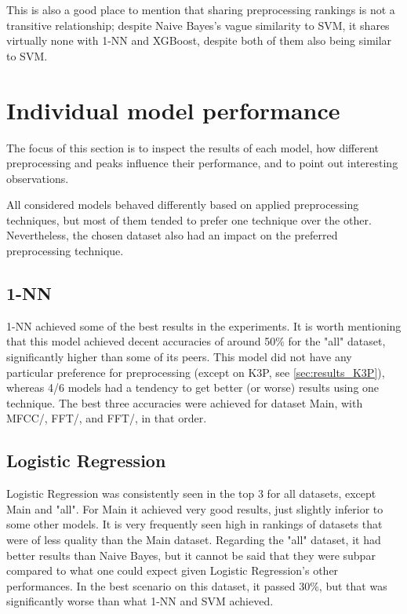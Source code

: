 \documentclass[../main.tex]{subfiles}
\begin{document}
This is also a good place to mention that sharing preprocessing rankings is not a transitive relationship; despite Naive Bayes's vague similarity to SVM, it shares virtually none with 1-NN and XGBoost, despite both of them also being similar to SVM.

\section{Individual model performance} %
\label{sec:results_individual_model_performance}
\newcommand{\plotmodelsummary}[2]{%
\begin{figure}[H]%
    \centering%
    \texttt{[image: figures/plots/model\_summary/\#1.pdf]}%
    \caption{All accuracies achieved by #1 across datasets, peak types, and preprocessing techniques}
    \label{#2}%
\end{figure}%
}%

The focus of this section is to inspect the results of each model, how different preprocessing and peaks influence their performance, and to point out interesting observations. 

All considered models behaved differently based on applied preprocessing techniques, but most of them tended to prefer one technique over the other. Nevertheless, the chosen dataset also had an impact on the preferred preprocessing technique.

\subsection{1-NN}
1-NN achieved some of the best results in the experiments. It is worth mentioning that this model achieved decent accuracies of around 50\% for the "all" dataset, significantly higher than some of its peers.
This model did not have any particular preference for preprocessing (except on K3P, see \ref{sec:results_K3P}), whereas 4/6 models had a tendency to get better (or worse) results using one technique. 
The best three accuracies were achieved for dataset Main, with MFCC/, FFT/, and FFT/, in that order.

\subsection{Logistic Regression}
Logistic Regression was consistently seen in the top 3 for all datasets, except Main and "all". For Main it achieved very good results, just slightly inferior to some other models. It is very frequently seen high in rankings of datasets that were of less quality than the Main dataset. Regarding the "all" dataset, it had better results than Naive Bayes, but it cannot be said that they were subpar compared to what one could expect given Logistic Regression's other performances. In the best scenario on this dataset, it passed 30\%, but that was significantly worse than what 1-NN and SVM achieved.
\end{document}
